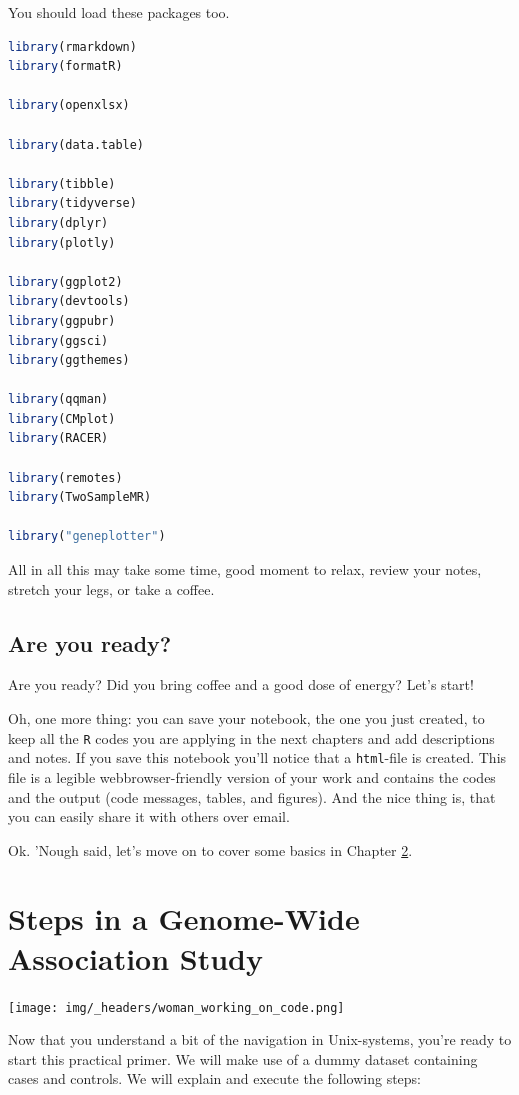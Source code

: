\documentclass[
]{book}
\newcommand{\passthrough}[1]{#1}
\begin{document}
You should load these packages too.

\begin{lstlisting}[language=R]
library(rmarkdown)
library(formatR)

library(openxlsx)

library(data.table)

library(tibble)
library(tidyverse)
library(dplyr)
library(plotly)

library(ggplot2)
library(devtools)
library(ggpubr)
library(ggsci)
library(ggthemes)

library(qqman)
library(CMplot)
library(RACER)

library(remotes)
library(TwoSampleMR)

library("geneplotter")
\end{lstlisting}

All in all this may take some time, good moment to relax, review your notes, stretch your legs, or take a coffee.

\hypertarget{are-you-ready}{%
\section{Are you ready?}\label{are-you-ready}}

Are you ready? Did you bring coffee and a good dose of energy? Let's start!

Oh, one more thing: you can save your notebook, the one you just created, to keep all the \passthrough{\lstinline!R!} codes you are applying in the next chapters and add descriptions and notes. If you save this notebook you'll notice that a \passthrough{\lstinline!html!}-file is created. This file is a legible webbrowser-friendly version of your work and contains the codes and the output (code messages, tables, and figures). And the nice thing is, that you can easily share it with others over email.

Ok. 'Nough said, let's move on to cover some basics in Chapter \ref{gwas-basics}.

\hypertarget{gwas-basics}{%
\chapter{Steps in a Genome-Wide Association Study}\label{gwas-basics}}

\texttt{[image: img/\_headers/woman\_working\_on\_code.png]}

Now that you understand a bit of the navigation in Unix-systems, you're ready to start this practical primer. We will make use of a dummy dataset containing cases and controls. We will explain and execute the following steps:
\end{document}
